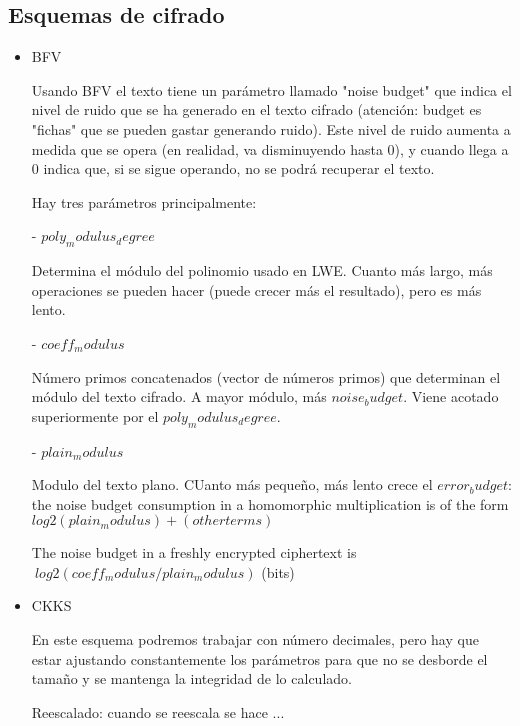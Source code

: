 \subsection{Esquemas de cifrado}

\begin{itemize}

  \item BFV

  Usando BFV el texto tiene un parámetro llamado "noise budget" que indica el nivel de ruido que se ha generado en el texto cifrado (atención: budget es "fichas" que se pueden gastar generando ruido). Este nivel de ruido aumenta a medida que se opera (en realidad, va disminuyendo hasta 0), y cuando llega a 0 indica que, si se sigue operando, no se podrá recuperar el texto.


  Hay tres parámetros principalmente:

  - $poly_modulus_degree$

  Determina el módulo del polinomio usado en LWE. Cuanto más largo, más operaciones se pueden hacer (puede crecer más el resultado), pero es más lento.

  - $coeff_modulus$

  Número primos concatenados (vector de números primos) que determinan el módulo del texto cifrado. A mayor módulo, más $noise_budget$. Viene acotado superiormente por el $poly_modulus_degree$.

  - $plain_modulus$

  Modulo del texto plano. CUanto más pequeño, más lento crece el $error_budget$: the noise budget consumption in a homomorphic multiplication is of the form $log2(plain_modulus) + (other terms)$

  The noise budget in a freshly encrypted ciphertext is $~ log2(coeff_modulus/plain_modulus)$  (bits)


  \item CKKS

  En este esquema podremos trabajar con número decimales, pero hay que estar ajustando constantemente los parámetros para que no se desborde el tamaño y se mantenga la integridad de lo calculado.

  Reescalado: cuando se reescala se hace ...


\end{itemize}
